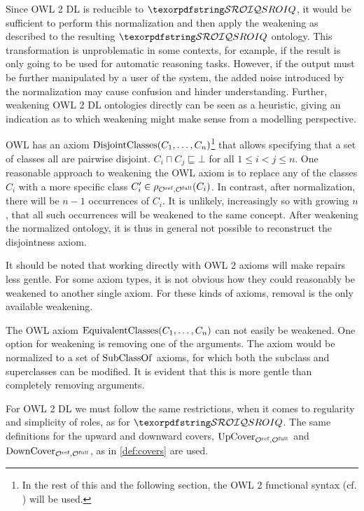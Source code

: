 Since OWL 2 DL is reducible to $\SROIQ$, it would be sufficient to perform this normalization and then apply the weakening as described to the resulting $\SROIQ$ ontology. This transformation is unproblematic in some contexts, for example, if the result is only going to be used for automatic reasoning tasks. However, if the output must be further manipulated by a user of the system, the added noise introduced by the normalization may cause confusion and hinder understanding. Further, weakening OWL 2 DL ontologies directly can be seen as a heuristic, giving an indication as to which weakening might make sense from a modelling perspective.

\begin{example}
  OWL has an axiom $\operatorname{DisjointClasses}(C_1, \dots, C_n)$\footnote{In the rest of this and the following section, the OWL 2 functional syntax (cf. \cite{motik2012ontology}) will be used.} that allows specifying that a set of classes all are pairwise disjoint. $C_i \sqcap C_j \sqsubseteq \bot$ for all $1 \leq i < j \leq n$. One reasonable approach to weakening the OWL axiom is to replace any of the classes $C_i$ with a more specific class $C_i' \in \rho_{{\mathcal{O}^\textnormal{ref}},{\mathcal{O}^\textnormal{full}}}(C_i)$. In contrast, after normalization, there will be $n - 1$ occurrences of $C_i$. It is unlikely, increasingly so with growing $n$, that all such occurrences will be weakened to the same concept. After weakening the normalized ontology, it is thus in general not possible to reconstruct the disjointness axiom.
\end{example}

It should be noted that working directly with OWL 2 axioms will make repairs less gentle. For some axiom types, it is not obvious how they could reasonably be weakened to another single axiom. For these kinds of axioms, removal is the only available weakening.

\begin{example}
  The OWL axiom $\operatorname{EquivalentClasses}(C_1, \dots, C_n)$ can not easily be weakened. One option for weakening is removing one of the arguments. The axiom would be normalized to a set of $\operatorname{SubClassOf}$ axioms, for which both the subclass and superclasses can be modified. It is evident that this is more gentle than completely removing arguments.
\end{example}

For OWL 2 DL we must follow the same restrictions, when it comes to regularity and simplicity of roles, as for $\SROIQ$. The same definitions for the upward and downward covers, ${\operatorname{UpCover}}_{{\mathcal{O}^\textnormal{ref}},{\mathcal{O}^\textnormal{full}}}$ and ${\operatorname{DownCover}}_{{\mathcal{O}^\textnormal{ref}},{\mathcal{O}^\textnormal{full}}}$, as in \cref{def:covers} are used.

